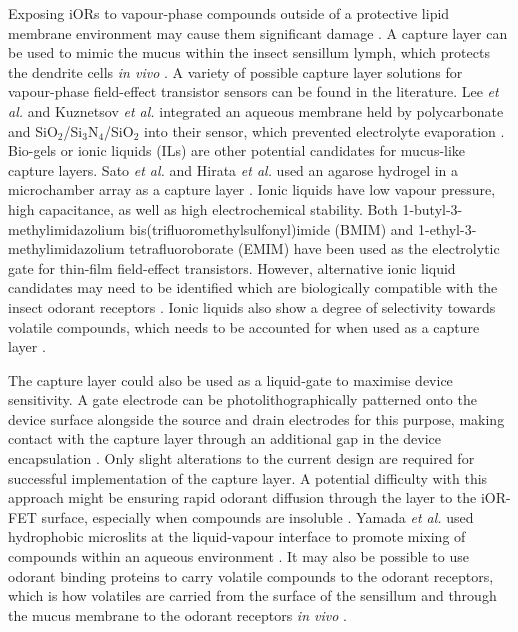 \documentclass[
  a4paper,
]{scrbook}
\begin{document}
Exposing iORs to vapour-phase compounds outside of a protective lipid
membrane environment may cause them significant damage
\autocite{Sato2014,Warden2019}. A capture layer can be used to mimic the
mucus within the insect sensillum lymph, which protects the dendrite
cells \emph{in vivo} \autocite{Shkodra2021,Sato2014,Hurot2020,Cali2020}.
A variety of possible capture layer solutions for vapour-phase
field-effect transistor sensors can be found in the literature. Lee
\emph{et al.} and Kuznetsov \emph{et al.} integrated an aqueous membrane
held by polycarbonate and SiO\(_2\)/Si\(_3\)N\(_4\)/SiO\(_2\) into their
sensor, which prevented electrolyte evaporation
\autocite{Lee2015,Kuznetsov2018}. Bio-gels or ionic liquids (ILs) are
other potential candidates for mucus-like capture layers. Sato \emph{et
al.} and Hirata \emph{et al.} used an agarose hydrogel in a microchamber
array as a capture layer \autocite{Sato2014,Hirata2021}. Ionic liquids
have low vapour pressure, high capacitance, as well as high
electrochemical stability. Both 1-butyl-3-methylimidazolium
bis(trifluoromethylsulfonyl)imide (BMIM) \autocite{Hwang2014,White2015}
and 1-ethyl-3-methylimidazolium tetrafluoroborate (EMIM)
\autocite{Inaba2014,Kiga2012} have been used as the electrolytic gate
for thin-film field-effect transistors. However, alternative ionic
liquid candidates may need to be identified which are biologically
compatible with the insect odorant receptors
\autocite{Gomes2019,Shukla2020}. Ionic liquids also show a degree of
selectivity towards volatile compounds, which needs to be accounted for
when used as a capture layer \autocite{Kulkarni2007}.

The capture layer could also be used as a liquid-gate to maximise device
sensitivity. A gate electrode can be photolithographically patterned
onto the device surface alongside the source and drain electrodes for
this purpose, making contact with the capture layer through an
additional gap in the device encapsulation \autocite{Shkodra2021}. Only
slight alterations to the current design are required for successful
implementation of the capture layer. A potential difficulty with this
approach might be ensuring rapid odorant diffusion through the layer to
the iOR-FET surface, especially when compounds are insoluble
\autocite{Yamada2021,Hurot2020,Warden2019,Cali2020,Lee2015,Spencer2021}.
Yamada \emph{et al.} used hydrophobic microslits at the liquid-vapour
interface to promote mixing of compounds within an aqueous environment
\autocite{Yamada2021}. It may also be possible to use odorant binding
proteins to carry volatile compounds to the odorant receptors, which is
how volatiles are carried from the surface of the sensillum and through
the mucus membrane to the odorant receptors \emph{in vivo}
\autocite{Larisika2015,Kotlowski2018,Brito2016,Cali2020,Pelosi2018,Sankaran2011}.
\end{document}

